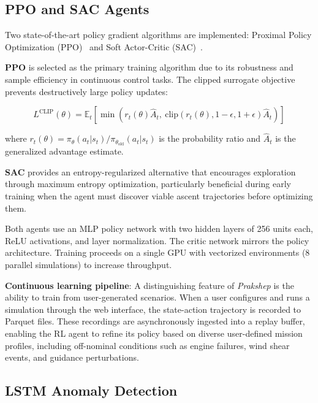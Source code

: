 \documentclass[conference]{IEEEtran}
\begin{document}
\subsection{PPO and SAC Agents}

Two state-of-the-art policy gradient algorithms are implemented: Proximal Policy Optimization (PPO)~\cite{schulman2017proximal} and Soft Actor-Critic (SAC)~\cite{haarnoja2018soft}.

\textbf{PPO} is selected as the primary training algorithm due to its robustness and sample efficiency in continuous control tasks. The clipped surrogate objective prevents destructively large policy updates:

\begin{equation}
    L^{\text{CLIP}}(\theta) = \mathbb{E}_t\!\left[\min\!\left(r_t(\theta)\hat{A}_t,\ \text{clip}(r_t(\theta), 1\!-\!\epsilon, 1\!+\!\epsilon)\hat{A}_t\right)\right]
    \label{eq:ppo}
\end{equation}

\noindent where $r_t(\theta) = \pi_\theta(a_t|s_t) / \pi_{\theta_{\text{old}}}(a_t|s_t)$ is the probability ratio and $\hat{A}_t$ is the generalized advantage estimate.

\textbf{SAC} provides an entropy-regularized alternative that encourages exploration through maximum entropy optimization, particularly beneficial during early training when the agent must discover viable ascent trajectories before optimizing them.

Both agents use an MLP policy network with two hidden layers of 256 units each, ReLU activations, and layer normalization. The critic network mirrors the policy architecture. Training proceeds on a single GPU with vectorized environments (8 parallel simulations) to increase throughput.

\textbf{Continuous learning pipeline}: A distinguishing feature of \textit{Prakshep} is the ability to train from user-generated scenarios. When a user configures and runs a simulation through the web interface, the state-action trajectory is recorded to Parquet files. These recordings are asynchronously ingested into a replay buffer, enabling the RL agent to refine its policy based on diverse user-defined mission profiles, including off-nominal conditions such as engine failures, wind shear events, and guidance perturbations.

\subsection{LSTM Anomaly Detection}
\end{document}
